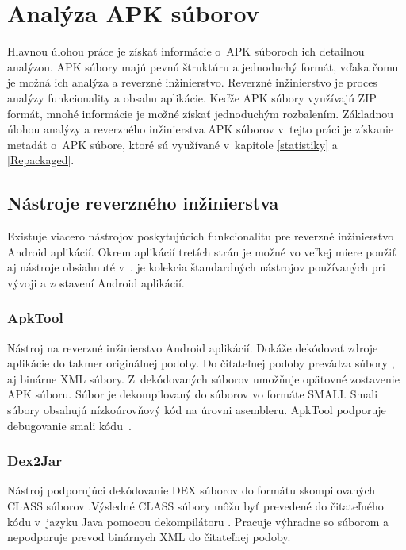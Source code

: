 \chapter{Analýza APK súborov}
\label{analyza}
Hlavnou úlohou práce je získať informácie o~APK súboroch ich detailnou analýzou. APK súbory majú pevnú štruktúru a jednoduchý formát, vďaka čomu je možná ich analýza a reverzné inžinierstvo. Reverzné inžinierstvo je proces analýzy funkcionality a obsahu aplikácie. Keďže APK súbory využívajú ZIP formát, mnohé informácie je možné získať jednoduchým rozbalením. Základnou úlohou analýzy a reverzného inžinierstva APK súborov v~tejto práci je získanie metadát o~APK súbore, ktoré sú využívané v~kapitole \ref{statistiky} a \ref{Repackaged}.

\section{Nástroje reverzného inžinierstva}
\label{nastroje_revezneho_inzinierstva}

Existuje viacero nástrojov poskytujúcich funkcionalitu pre reverzné inžinierstvo Android aplikácií. Okrem aplikácií tretích strán je možné vo veľkej miere použiť aj nástroje obsiahnuté v~. je kolekcia štandardných nástrojov používaných pri vývoji a zostavení Android aplikácií. 

\subsection{ApkTool}
\label{ApkTool}
Nástroj na reverzné inžinierstvo Android aplikácií. Dokáže dekódovať zdroje aplikácie do takmer originálnej podoby. Do čitateľnej podoby prevádza súbory ,  aj binárne XML súbory. Z~dekódovaných súborov umožňuje opätovné zostavenie APK súboru. Súbor  je dekompilovaný do súborov vo formáte SMALI. Smali súbory obsahujú nízkoúrovňový kód na úrovni asembleru. ApkTool podporuje debugovanie smali kódu~\cite{apkTool}.

\subsection{Dex2Jar}
\label{Dex2Jar}
Nástroj podporujúci dekódovanie DEX súborov do formátu skompilovaných CLASS súborov .Výsledné CLASS súbory môžu byť prevedené do čitateľného kódu v~jazyku Java pomocou dekompilátoru . Pracuje výhradne so súborom  a nepodporuje prevod binárnych XML do čitateľnej podoby.

